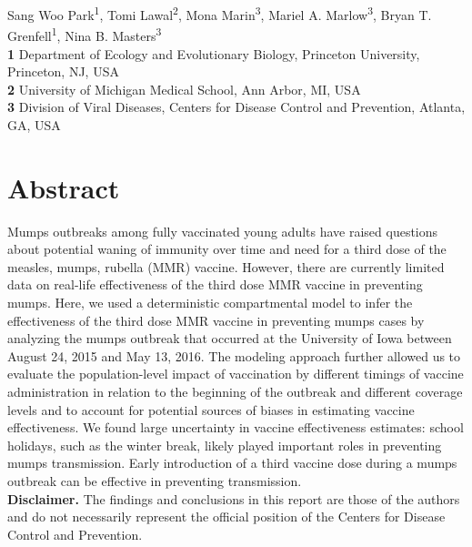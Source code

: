 \documentclass[12pt]{article}
\date{\today}
\begin{document}
\begin{flushleft}{
	\Large
	\textbf{}
}
\newline
Sang Woo Park\textsuperscript{1},
Tomi Lawal\textsuperscript{2},
Mona Marin\textsuperscript{3},
Mariel A. Marlow\textsuperscript{3},
Bryan T. Grenfell\textsuperscript{1},
Nina B. Masters\textsuperscript{3}
\\ 
\bigskip
\textbf{1} Department of Ecology and Evolutionary Biology, Princeton University, Princeton, NJ, USA
\\
\textbf{2} University of Michigan Medical School, Ann Arbor, MI, USA
\\
\textbf{3} Division of Viral Diseases, Centers for Disease Control and Prevention, Atlanta, GA, USA
\end{flushleft} 

\section*{Abstract}

Mumps outbreaks among fully vaccinated young adults have raised questions about potential waning of immunity over time and need for a third dose of the measles, mumps, rubella (MMR) vaccine. 
However, there are currently limited data on real-life effectiveness of the third dose MMR vaccine in preventing mumps.
Here, we used a deterministic compartmental model to infer the effectiveness of the third dose MMR vaccine in preventing mumps cases by analyzing the mumps outbreak that occurred at the University of Iowa between August 24, 2015 and May 13, 2016. 
The modeling approach further allowed us to evaluate the population-level impact of vaccination by different timings of vaccine administration in relation to the beginning of the outbreak and different coverage levels and to account for potential sources of biases in estimating vaccine effectiveness. 
We found large uncertainty in vaccine effectiveness estimates: school holidays, such as the winter break, likely played important roles in preventing mumps transmission. 
Early introduction of a third vaccine dose during a mumps outbreak can be effective in preventing transmission. 
\\
\newline
\textbf{Disclaimer.} The findings and conclusions in this report are those of the authors and do not necessarily represent the official position of the Centers for Disease Control and Prevention.
\end{document}
